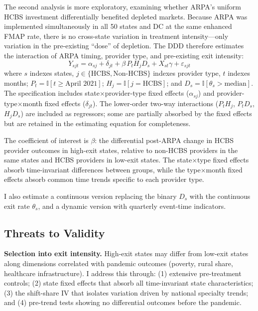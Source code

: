 \documentclass[12pt]{article}
\newcommand{\ind}{\mathbb{I}}
\begin{document}
The second analysis is more exploratory, examining whether ARPA's uniform HCBS investment differentially benefited depleted markets. Because ARPA was implemented simultaneously in all 50 states and DC at the same enhanced FMAP rate, there is no cross-state variation in treatment intensity---only variation in the pre-existing ``dose'' of depletion. The DDD therefore estimates the interaction of ARPA timing, provider type, and pre-existing exit intensity:
\begin{equation}
Y_{sjt} = \alpha_{sj} + \delta_{jt} + \beta \, P_{t} H_{j} D_s + X_{st} \gamma + \varepsilon_{sjt}
\label{eq:ddd}
\end{equation}
where $s$ indexes states, $j \in \{\text{HCBS}, \text{Non-HCBS}\}$ indexes provider type, $t$ indexes months; $P_t = \ind[t \geq \text{April 2021}]$; $H_j = \ind[j = \text{HCBS}]$; and $D_s = \ind[\theta_s > \text{median}]$. The specification includes state$\times$provider-type fixed effects ($\alpha_{sj}$) and provider-type$\times$month fixed effects ($\delta_{jt}$). The lower-order two-way interactions ($P_t H_j$, $P_t D_s$, $H_j D_s$) are included as regressors; some are partially absorbed by the fixed effects but are retained in the estimating equation for completeness.

The coefficient of interest is $\beta$: the differential post-ARPA change in HCBS provider outcomes in high-exit states, relative to non-HCBS providers in the same states and HCBS providers in low-exit states. The state$\times$type fixed effects absorb time-invariant differences between groups, while the type$\times$month fixed effects absorb common time trends specific to each provider type.

I also estimate a continuous version replacing the binary $D_s$ with the continuous exit rate $\theta_s$, and a dynamic version with quarterly event-time indicators.

\subsection{Threats to Validity}

\textbf{Selection into exit intensity.} High-exit states may differ from low-exit states along dimensions correlated with pandemic outcomes (poverty, rural share, healthcare infrastructure). I address this through: (1) extensive pre-treatment controls; (2) state fixed effects that absorb all time-invariant state characteristics; (3) the shift-share IV that isolates variation driven by national specialty trends; and (4) pre-trend tests showing no differential outcomes before the pandemic.
\end{document}
